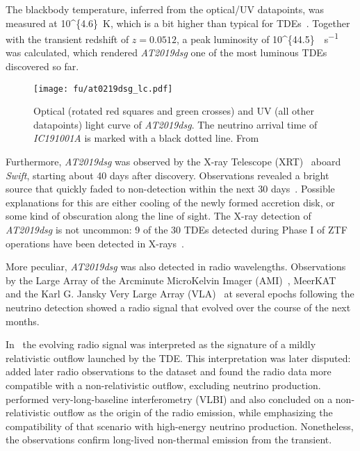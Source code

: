 The blackbody temperature, inferred from the optical/UV datapoints, was measured at \SI[parse-numbers = false]{10^{4.6}}{\K}, which is a bit higher than typical for TDEs~. Together with the transient redshift of $z=0.0512$, a peak luminosity of \SI[parse-numbers = false]{10^{44.5}}{\erg\per\s} was calculated, which rendered \emph{AT2019dsg} one of the most luminous TDEs discovered so far.

\begin{figure*}[htb]
    \texttt{[image: fu/at0219dsg\_lc.pdf]}
    \caption[\textit{AT2019dsg} optical/UV light curve]{Optical (rotated red squares and green crosses) and UV (all other datapoints) light curve of \textit{AT2019dsg}. The neutrino arrival time of \textit{IC191001A} is marked with a black dotted line. From~\cite{Stein2021}}
\end{figure*}

Furthermore, \emph{AT2019dsg} was observed by the X-ray Telescope (XRT)~ aboard \textit{Swift}, starting about 40 days after discovery. Observations revealed a bright source that quickly faded to non-detection within the next 30 days~\cite{Stein2021}. Possible explanations for this are either cooling of the newly formed accretion disk, or some kind of obscuration along the line of sight. The X-ray detection of \textit{AT2019dsg} is not uncommon: 9 of the 30 TDEs detected during Phase I of ZTF operations have been detected in X-rays~.

More peculiar, \emph{AT2019dsg} was also detected in radio wavelengths. Observations by the Large Array of the Arcminute MicroKelvin Imager (AMI)~, MeerKAT~ and the Karl G. Jansky Very Large Array (VLA)~ at several epochs following the neutrino detection showed a radio signal that evolved over the course of the next months.

In~\cite{Stein2021} the evolving radio signal was interpreted as the signature of a mildly relativistic outflow launched by the TDE. This interpretation was later disputed:~ added later radio observations to the dataset and found the radio data more compatible with a non-relativistic outflow, excluding neutrino production.~ performed very-long-baseline interferometry (VLBI) and also concluded on a non-relativistic outflow as the origin of the radio emission, while emphasizing the compatibility of that scenario with high-energy neutrino production. Nonetheless, the observations confirm long-lived non-thermal emission from the transient.


